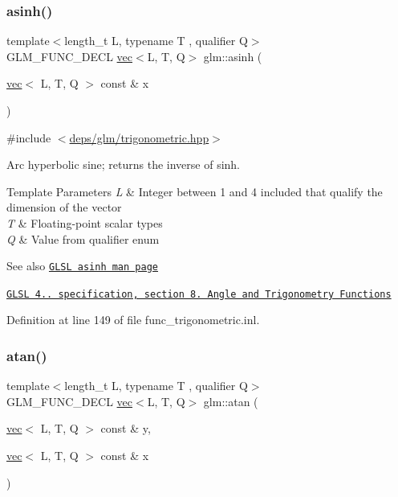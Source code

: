 \subsubsection{\texorpdfstring{asinh()}{asinh()}}
{\footnotesize\ttfamily template$<$length\+\_\+t L, typename T , qualifier Q$>$ \\
G\+L\+M\+\_\+\+F\+U\+N\+C\+\_\+\+D\+E\+CL \hyperlink{structglm_1_1vec}{vec}$<$L, T, Q$>$ glm\+::asinh (\begin{DoxyParamCaption}\item[{\hyperlink{structglm_1_1vec}{vec}$<$ L, T, Q $>$ const \&}]{x }\end{DoxyParamCaption})}



{\ttfamily \#include $<$\hyperlink{trigonometric_8hpp}{deps/glm/trigonometric.\+hpp}$>$}

Arc hyperbolic sine; returns the inverse of sinh.


\begin{DoxyTemplParams}{Template Parameters}
{\em L} & Integer between 1 and 4 included that qualify the dimension of the vector \\
\hline
{\em T} & Floating-\/point scalar types \\
\hline
{\em Q} & Value from qualifier enum\\
\hline
\end{DoxyTemplParams}
\begin{DoxySeeAlso}{See also}
\href{http://www.opengl.org/sdk/docs/manglsl/xhtml/asinh.xml}{\tt G\+L\+SL asinh man page} 

\href{http://www.opengl.org/registry/doc/GLSLangSpec.4.20.8.pdf}{\tt G\+L\+SL 4.. specification, section 8. Angle and Trigonometry Functions} 
\end{DoxySeeAlso}


Definition at line 149 of file func\+\_\+trigonometric.\+inl.

\mbox{\label{group__core__func__trigonometric_gac61629f3a4aa14057e7a8cae002291db}} 
\subsubsection{\texorpdfstring{atan()}{atan()}\hspace{0.1cm}{\footnotesize\ttfamily [1/2]}}
{\footnotesize\ttfamily template$<$length\+\_\+t L, typename T , qualifier Q$>$ \\
G\+L\+M\+\_\+\+F\+U\+N\+C\+\_\+\+D\+E\+CL \hyperlink{structglm_1_1vec}{vec}$<$L, T, Q$>$ glm\+::atan (\begin{DoxyParamCaption}\item[{\hyperlink{structglm_1_1vec}{vec}$<$ L, T, Q $>$ const \&}]{y,  }\item[{\hyperlink{structglm_1_1vec}{vec}$<$ L, T, Q $>$ const \&}]{x }\end{DoxyParamCaption})}



